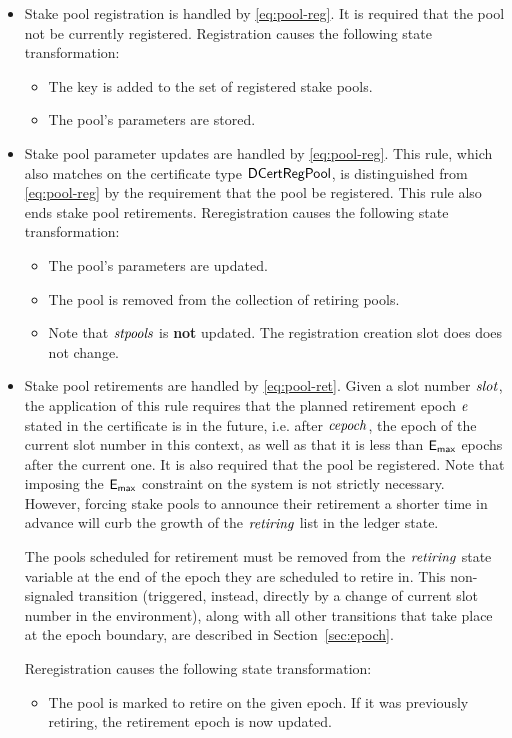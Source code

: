 \begin{itemize}
  \item Stake pool registration is handled by \cref{eq:pool-reg}.
    It is required that the pool not be currently registered.
    Registration causes the following state transformation:
    \begin{itemize}
      \item The key is added to the set of registered stake pools.
      \item The pool's parameters are stored.
    \end{itemize}
  \item Stake pool parameter updates are handled by \cref{eq:pool-reg}.
    This rule, which also matches on the certificate type $\mathsf{DCertRegPool}$,
    is distinguished from \cref{eq:pool-reg} by the requirement that
    the pool be registered. This rule also ends stake pool retirements.
    Reregistration causes the following state transformation:
    \begin{itemize}
      \item The pool's parameters are updated.
      \item The pool is removed from the collection of retiring pools.
      \item Note that $\mathit{stpools}$ is \textbf{not} updated.
        The registration creation slot does does not change.
    \end{itemize}
  \item Stake pool retirements are handled by \cref{eq:pool-ret}.
    Given a slot number $\mathit{slot}$, the application of this rule requires that the
    planned retirement epoch $\mathit{e}$ stated in the certificate is in the future,
    i.e. after $\mathit{cepoch}$, the epoch of the current slot number in this context, as well as
    that it is less than $\mathsf{E_{max}}$ epochs after the current one.
    It is also required that the pool be registered.
    Note that imposing the $\mathsf{E_{max}}$ constraint on the system is not strictly necessary.
    However, forcing stake pools to announce their retirement a shorter time in
    advance will curb the growth of the $\mathit{retiring}$ list in the ledger state.

    The pools scheduled for retirement must be removed from
    the $\mathit{retiring}$ state variable at the end of the epoch they are scheduled
    to retire in. This non-signaled transition (triggered, instead, directly by a
    change of current slot number in the environment), along with all other transitions
    that take place at the epoch boundary, are described in Section~\ref{sec:epoch}.

    Reregistration causes the following state transformation:
    \begin{itemize}
      \item The pool is marked to retire on the given epoch.
        If it was previously retiring, the retirement epoch is now updated.
    \end{itemize}
\end{itemize}

